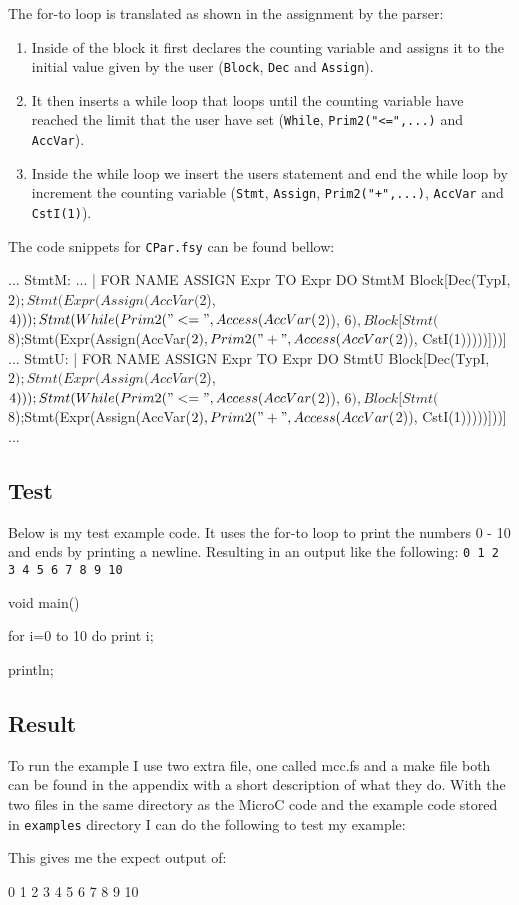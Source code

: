 The for-to loop is translated as shown in the assignment by the parser: 
\begin{enumerate}
    \item Inside of the block it first declares the counting variable and
        assigns it to the initial value given by the user (\texttt{Block},
        \texttt{Dec} and \texttt{Assign}).
    \item It then inserts a while loop that loops until the counting variable
        have reached the limit that the user have set (\texttt{While},
        \texttt{Prim2("<=",...)} and \texttt{AccVar}).
    \item Inside the while loop we insert the users statement and end the while
        loop by increment the counting variable (\texttt{Stmt}, \texttt{Assign},
        \texttt{Prim2("+",...)}, \texttt{AccVar} and \texttt{CstI(1)}).
\end{enumerate}
The code snippets for \texttt{CPar.fsy} can be found bellow:
\begin{ccode}
...
StmtM:
...
  | FOR NAME ASSIGN Expr TO Expr DO StmtM { Block[Dec(TypI, $2); Stmt(Expr(Assign(AccVar($2), $4))); Stmt(While(Prim2("<=", Access(AccVar($2)), $6), Block[Stmt($8);Stmt(Expr(Assign(AccVar($2), Prim2("+", Access(AccVar($2)), CstI(1)))))]))] }
...
StmtU:
  | FOR NAME ASSIGN Expr TO Expr DO StmtU { Block[Dec(TypI, $2); Stmt(Expr(Assign(AccVar($2), $4))); Stmt(While(Prim2("<=", Access(AccVar($2)), $6), Block[Stmt($8);Stmt(Expr(Assign(AccVar($2), Prim2("+", Access(AccVar($2)), CstI(1)))))]))] }
...
\end{ccode}
\subsection{Test}
Below is my test example code. It uses the for-to loop to print the numbers 0 - 10
and ends by printing a newline. Resulting in an output like the following:
\texttt{0 1 2 3 4 5 6 7 8 9 10}
\begin{ccode}
void main() {
  for i=0 to 10 do 
    print i;

  println;
}
\end{ccode}
\subsection{Result}
To run the example I use two extra file, one called mcc.fs and a make file both can
be found in the appendix with a short description of what they do. With the two
files in the same directory as the MicroC code and the example code stored in
\texttt{examples} directory I can do the following to test my example:
\begin{bashcode}
\end{bashcode}
This gives me the expect output of:
\begin{bashcode}
0 1 2 3 4 5 6 7 8 9 10

\end{bashcode}

